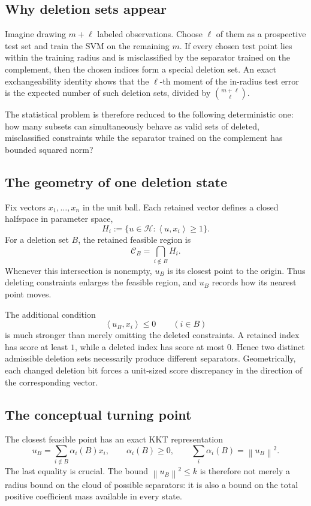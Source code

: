 \documentclass[11pt]{article}
\theoremstyle{definition}
\theoremstyle{remark}
\newcommand{\Hh}{\mathcal H}
\newcommand{\ip}[2]{\left\langle #1,#2\right\rangle}
\newcommand{\norm}[1]{\left\lVert #1\right\rVert}
\begin{document}
\subsection{Why deletion sets appear}

Imagine drawing \(m+\ell\) labeled observations. Choose \(\ell\) of them as
a prospective test set and train the SVM on the remaining \(m\). If every
chosen test point lies within the training radius and is misclassified by
the separator trained on the complement, then the chosen indices form a
special deletion set. An exact exchangeability identity shows that the
\(\ell\)-th moment of the in-radius test error is the expected number of such
deletion sets, divided by \(\binom{m+\ell}{\ell}\).

The statistical problem is therefore reduced to the following deterministic
one: how many subsets can simultaneously behave as valid sets of deleted,
misclassified constraints while the separator trained on the complement has
bounded squared norm?

\subsection{The geometry of one deletion state}

Fix vectors \(x_1,\ldots,x_n\) in the unit ball. Each retained vector defines
a closed halfspace in parameter space,
\[
 H_i:=\{u\in\Hh:\ip{u}{x_i}\ge1\}.
\]
For a deletion set \(B\), the retained feasible region is
\[
 \mathcal C_B=\bigcap_{i\notin B}H_i.
\]
Whenever this intersection is nonempty, \(u_B\) is its closest point to the
origin. Thus deleting constraints enlarges the feasible region, and \(u_B\)
records how its nearest point moves.

The additional condition
\[
 \ip{u_B}{x_i}\le0\qquad(i\in B)
\]
is much stronger than merely omitting the deleted constraints. A retained
index has score at least \(1\), while a deleted index has score at most
\(0\). Hence two distinct admissible deletion sets necessarily produce
different separators. Geometrically, each changed deletion bit forces a
unit-sized score discrepancy in the direction of the corresponding vector.

\subsection{The conceptual turning point}

The closest feasible point has an exact KKT representation
\[
 u_B=\sum_{i\notin B}\alpha_i(B)x_i,
 \qquad
 \alpha_i(B)\ge0,
 \qquad
 \sum_i\alpha_i(B)=\norm{u_B}^2.
\]
The last equality is crucial. The bound \(\norm{u_B}^2\le k\) is therefore
not merely a radius bound on the cloud of possible separators: it is also a
bound on the total positive coefficient mass available in every state.
\end{document}
